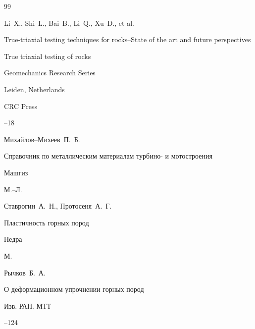 \begin{thebibliography}{99}

\by Li~X., Shi~L., Bai~B., Li~Q., Xu~D., et al.

\paper True-triaxial testing techniques for rocks--State of the art and future perspectives 

\inbook True triaxial testing of rocks

\serial  Geomechanics Research Series



\publaddr Leiden,  Netherlands

\publ CRC Press

--18







\by Михайлов--Михеев~П.~Б.

\book Справочник по металлическим материалам турбино- и мотостроения


\publ Машгиз

\publaddr М.--Л.





\by Ставрогин~А.~Н., Протосеня~А.~Г.

\book Пластичность горных пород


\publ Недра

\publaddr М.







\by Рычков~Б.~А.

\paper О деформационном упрочнении горных пород

\jour Изв. РАН. МТТ



--124





\end{thebibliography}





\newpage



